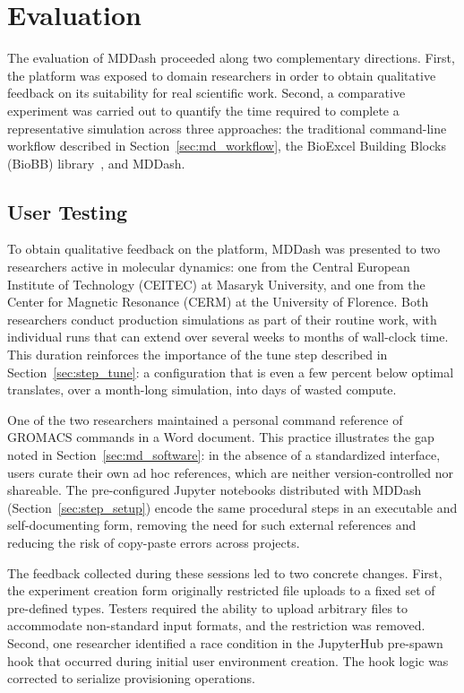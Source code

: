 \documentclass[
  digital,     %
  color,       %
  oneside,     %
  nosansbold,  %
  nocolorbold, %
  lof,         %
  lot,         %
]{fithesis4}
\begin{document}
\chapter{Evaluation}

The evaluation of MDDash proceeded along two complementary directions. First, the platform was exposed to domain researchers in order to obtain qualitative feedback on its suitability for real scientific work. Second, a comparative experiment was carried out to quantify the time required to complete a representative simulation across three approaches: the traditional command-line workflow described in Section~\ref{sec:md_workflow}, the BioExcel Building Blocks (BioBB) library~\cite{BioBB}, and MDDash.

\section{User Testing}
\label{sec:user_testing}

To obtain qualitative feedback on the platform, MDDash was presented to two researchers active in molecular dynamics: one from the Central European Institute of Technology (CEITEC) at Masaryk University, and one from the Center for Magnetic Resonance (CERM) at the University of Florence. Both researchers conduct production simulations as part of their routine work, with individual runs that can extend over several weeks to months of wall-clock time. This duration reinforces the importance of the tune step described in Section~\ref{sec:step_tune}: a configuration that is even a few percent below optimal translates, over a month-long simulation, into days of wasted compute.

One of the two researchers maintained a personal command reference of GROMACS commands in a Word document. This practice illustrates the gap noted in Section~\ref{sec:md_software}: in the absence of a standardized interface, users curate their own ad hoc references, which are neither version-controlled nor shareable. The pre-configured Jupyter notebooks distributed with MDDash (Section~\ref{sec:step_setup}) encode the same procedural steps in an executable and self-documenting form, removing the need for such external references and reducing the risk of copy-paste errors across projects.

The feedback collected during these sessions led to two concrete changes. First, the experiment creation form originally restricted file uploads to a fixed set of pre-defined types. Testers required the ability to upload arbitrary files to accommodate non-standard input formats, and the restriction was removed. Second, one researcher identified a race condition in the JupyterHub pre-spawn hook that occurred during initial user environment creation. The hook logic was corrected to serialize provisioning operations.
\end{document}
